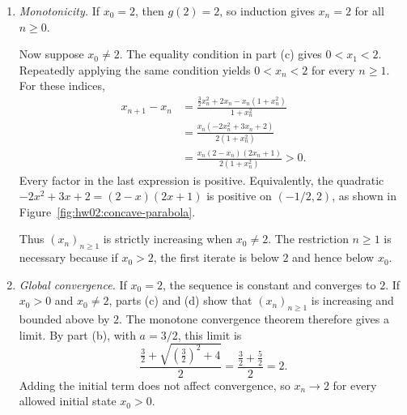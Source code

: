 \begin{enumerate}
    \newpage

  \item \textit{Monotonicity.}
    If $x_0=2$, then $g(2)=2$, so induction gives $x_n=2$
    for all $n\geq0$.

    Now suppose $x_0\ne2$. The equality condition in part (c)
    gives $0<x_1<2$. Repeatedly applying the same condition yields
    $0<x_n<2$ for every $n\geq1$. For these indices,
    \[
      \begin{aligned}
        x_{n+1}-x_n
          &=\frac{\tfrac32x_n^2+2x_n-x_n(1+x_n^2)}{1+x_n^2}\\
          &=\frac{x_n(-2x_n^2+3x_n+2)}{2(1+x_n^2)}\\
          &=\frac{x_n(2-x_n)(2x_n+1)}{2(1+x_n^2)}>0.
      \end{aligned}
    \]
    Every factor in the last expression is positive. Equivalently,
    the quadratic $-2x^2+3x+2=(2-x)(2x+1)$ is positive on
    $(-1/2,2)$, as shown in Figure~\ref{fig:hw02:concave-parabola}.
    \begin{marginfigure}
      \centering
      
      \caption{The quadratic $-2x^2+3x+2$ is positive between
        its roots $-1/2$ and $2$.}
      \label{fig:hw02:concave-parabola}
    \end{marginfigure}
    Thus $(x_n)_{n\geq1}$ is strictly increasing when $x_0\ne2$.
    The restriction $n\geq1$ is necessary because if $x_0>2$, the first
    iterate is below $2$ and hence below $x_0$.

  \item \textit{Global convergence.}
    If $x_0=2$, the sequence is constant and converges to $2$.
    If $x_0>0$ and $x_0\ne2$, parts (c) and (d) show that
    $(x_n)_{n\geq1}$ is increasing and bounded above by $2$.
    The monotone convergence theorem therefore gives a limit.
    By part (b), with $a=3/2$, this limit is
    \[
      \frac{\tfrac32+\sqrt{(\tfrac32)^2+4}}2
        =\frac{\tfrac32+\tfrac52}2=2.
    \]
    Adding the initial term does not affect convergence, so
    $x_n\to2$ for every allowed initial state $x_0>0$.
\end{enumerate}
